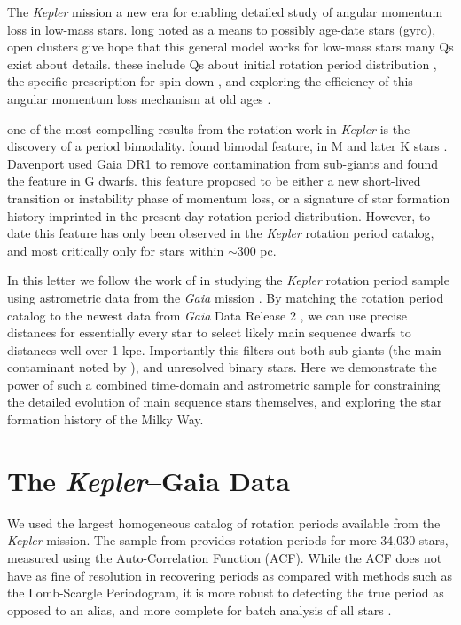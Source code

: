 \documentclass[preprint2]{aastex62}
\newcommand{\Kepler}{\textsl{Kepler}\xspace}
\begin{document}
The \Kepler mission \citep{borucki2010} a new era for enabling detailed study of angular momentum loss in low-mass stars. long noted as a means to possibly age-date stars (gyro), open clusters give hope that this general model works for low-mass stars
many Qs exist about details. these include Qs about initial rotation period distribution \citep[e.g.][]{barnes2010,matt2015}, the specific prescription for spin-down \citep{angus2015}, and exploring the efficiency of this angular momentum loss mechanism at old ages \citep{van-saders2016}.


one of the most compelling results from the rotation work in \Kepler is the discovery of a period bimodality. 
\citet{mcquillan2013} found bimodal feature, in M and later K stars \citep{mcquillan2014}. Davenport used Gaia DR1 to remove contamination from sub-giants and found the feature in G dwarfs. this feature proposed to be either a new short-lived transition or instability phase of momentum loss, or a signature of star formation history imprinted in the present-day rotation period distribution. However, to date this feature has only been observed in the \Kepler rotation period catalog, and most critically only for stars within $\sim$300 pc.



In this letter we follow the work of \citet{davenport2017} in studying the \Kepler rotation period sample using astrometric data from the {\em Gaia} mission \citep{gaia}. By matching the \citet{mcquillan2014} rotation period catalog to the newest data from {\em Gaia} Data Release 2 \citep{gaia_dr2}, we can use precise distances for essentially every star to select likely main sequence dwarfs to distances well over 1 kpc. Importantly this filters out both sub-giants (the main contaminant noted by \cite{davenport2017}), and unresolved binary stars.
Here we demonstrate the power of such a combined time-domain and astrometric sample for constraining the detailed evolution of main sequence stars themselves, and exploring the star formation history of the Milky Way.
 



\section{The \Kepler--Gaia Data}

We used the largest homogeneous catalog of rotation periods available from the \Kepler mission. The sample from \citet{mcquillan2014} provides rotation periods for more 34,030 stars, measured using the Auto-Correlation Function (ACF). While the ACF does not have as fine of resolution in recovering periods as compared with methods such as the Lomb-Scargle Periodogram, it is more robust to detecting the true period as opposed to an alias, and more complete for batch analysis of all stars \citep[e.g. see][]{aigrain2015}.
\end{document}
